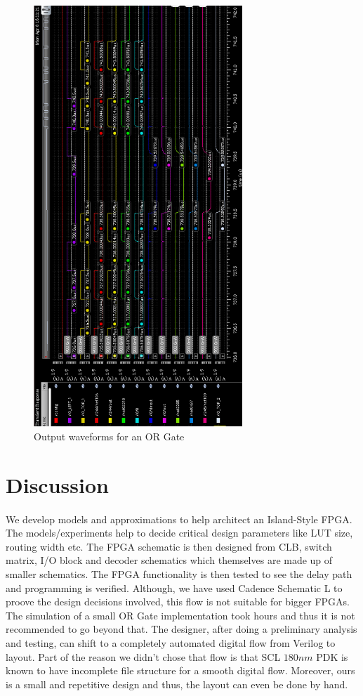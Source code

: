 \begin{figure}[H]
\centering
\includegraphics[width=0.7\textwidth]{Short_OR_Delays.png}
\caption{Output waveforms for an OR Gate}
\label{fig:Figure}
\end{figure}

\section{Discussion}
\paragraph{}

We develop models and approximations to help architect an Island-Style FPGA. The models/experiments help to decide critical design parameters like LUT size, routing width etc. The FPGA schematic is then designed from CLB, switch matrix, I/O block and decoder schematics which themselves are made up of smaller schematics. The FPGA functionality is then tested to see the delay path and programming is verified. Although, we have used Cadence Schematic L to proove the design decisions involved, this flow is not suitable for bigger FPGAs. The simulation of a small OR Gate implementation took hours and thus it is not recommended to go beyond that. The designer, after doing a preliminary analysis and testing, can shift to a completely automated digital flow from Verilog to layout. Part of the reason we didn't chose that flow is that SCL $180nm$ PDK is known to have incomplete file structure for a smooth digital flow. Moreover, ours is a small and repetitive design and thus, the layout can even be done by hand.
